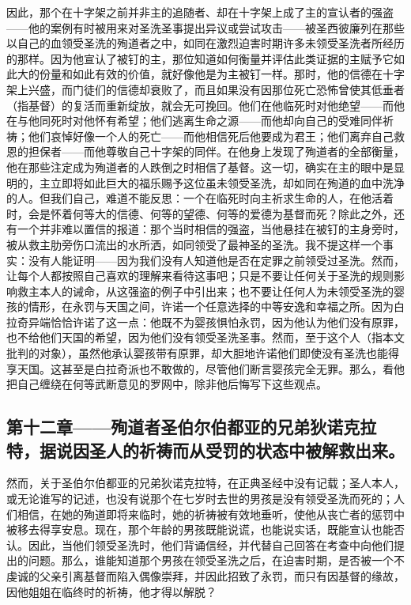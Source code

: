 因此，那个在十字架之前并非主的追随者、却在十字架上成了主的宣认者的强盗——他的案例有时被用来对圣洗圣事提出异议或尝试攻击——被圣西彼廉列在那些以自己的血领受圣洗的殉道者之中，如同在激烈迫害时期许多未领受圣洗者所经历的那样。因为他宣认了被钉的主，那位知道如何衡量并评估此类证据的主赋予它如此大的份量和如此有效的价值，就好像他是为主被钉一样。那时，他的信德在十字架上兴盛，而门徒们的信德却衰败了，而且如果没有因那位死亡恐怖曾使其低垂者（指基督）的复活而重新绽放，就会无可挽回。他们在他临死时对他绝望——而他在与他同死时对他怀有希望；他们逃离生命之源——而他却向自己的受难同伴祈祷；他们哀悼好像一个人的死亡——而他相信死后他要成为君王；他们离弃自己救恩的担保者——而他尊敬自己十字架的同伴。在他身上发现了殉道者的全部衡量，他在那些注定成为殉道者的人跌倒之时相信了基督。这一切，确实在主的眼中是显明的，主立即将如此巨大的福乐赐予这位虽未领受圣洗，却如同在殉道的血中洗净的人。但我们自己，难道不能反思：一个在临死时向主祈求生命的人，在他活着时，会是怀着何等大的信德、何等的望德、何等的爱德为基督而死？除此之外，还有一个并非难以置信的报道：那个当时相信的强盗，当他悬挂在被钉的主身旁时，被从救主肋旁伤口流出的水所洒，如同领受了最神圣的圣洗。我不提这样一个事实：没有人能证明——因为我们没有人知道他是否在定罪之前领受过圣洗。然而，让每个人都按照自己喜欢的理解来看待这事吧；只是不要让任何关于圣洗的规则影响救主本人的诫命，从这强盗的例子中引出来；也不要让任何人为未领受圣洗的婴孩的情形，在永罚与天国之间，许诺一个任意选择的中等安逸和幸福之所。因为白拉奇异端恰恰许诺了这一点：他既不为婴孩惧怕永罚，因为他认为他们没有原罪，也不给他们天国的希望，因为他们没有领受圣洗圣事。然而，至于这个人（指本文批判的对象），虽然他承认婴孩带有原罪，却大胆地许诺他们即使没有圣洗也能得享天国。这甚至是白拉奇派也不敢做的，尽管他们断言婴孩完全无罪。那么，看他把自己缠绕在何等武断意见的罗网中，除非他后悔写下这些观点。\par


\subsection{第十二章——殉道者圣伯尔伯都亚的兄弟狄诺克拉特，据说因圣人的祈祷而从受罚的状态中被解救出来。}

然而，关于圣伯尔伯都亚的兄弟狄诺克拉特，在正典圣经中没有记载；圣人本人，或无论谁写的记述，也没有说那个在七岁时去世的男孩是没有领受圣洗而死的；人们相信，在她的殉道即将来临时，她的祈祷被有效地垂听，使他从丧亡者的惩罚中被移去得享安息。现在，那个年龄的男孩既能说谎，也能说实话，既能宣认也能否认。因此，当他们领受圣洗时，他们背诵信经，并代替自己回答在考查中向他们提出的问题。那么，谁能知道那个男孩在领受圣洗之后，在迫害时期，是否被一个不虔诚的父亲引离基督而陷入偶像崇拜，并因此招致了永罚，而只有因基督的缘故，因他姐姐在临终时的祈祷，他才得以解脱？\par

